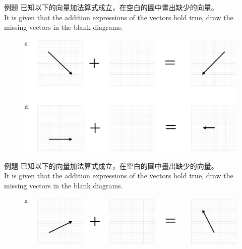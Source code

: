 \documentclass[beamer=true]{standalone}
\begin{document}
\begin{frame}{例題}
    已知以下的向量加法算式成立，在空白的圖中畫出缺少的向量。 \\It is given that the addition expressions of the vectors hold true, draw the missing vectors in the blank diagrams.
    \begin{figure}[h!]
        \centering
        \includegraphics[width=\textwidth]{../../assets/9088f28e.png}
    \end{figure}
\end{frame}
\begin{frame}[t]{例題}
    已知以下的向量加法算式成立，在空白的圖中畫出缺少的向量。 \\It is given that the addition expressions of the vectors hold true, draw the missing vectors in the blank diagrams.\bigskip
    \begin{figure}[h!]
        \centering
        \includegraphics[width=\textwidth]{../../assets/6767fde4.png}
    \end{figure}
\end{frame}
\end{document}
